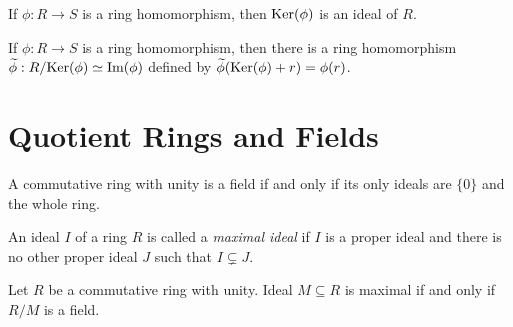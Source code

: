 \begin{theorem}
	If $\phi : R \rightarrow S$ is a ring homomorphism, then $\text{Ker}(\phi)$ is an
	ideal of $R$.
\end{theorem}

\begin{theorem}
	If $\phi : R \rightarrow S$ is a ring homomorphism, then there is a ring
	homomorphism $\widetilde{\phi} : R/\text{Ker}(\phi) \simeq \text{Im}(\phi)$ defined by
	$\widetilde{\phi}(\text{Ker}(\phi) + r) = \phi(r)$.
\end{theorem}

\section*{Quotient Rings and Fields}

\begin{theorem}
	A commutative ring with unity is a field if and only if its only ideals are
	$\{0\}$ and the whole ring.
\end{theorem}

\begin{definition}
	An ideal $I$ of a ring $R$ is called a \emph{maximal ideal} if $I$ is a proper
	ideal and there is no other proper ideal $J$ such that $I \subsetneq J$.
\end{definition}

\begin{theorem}
	Let $R$ be a commutative ring with unity. Ideal $M \subseteq R$ is maximal if
	and only if $R/M$ is a field.
\end{theorem}

